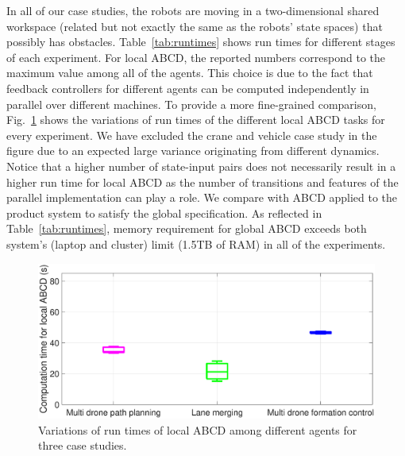 In all of our case studies, the robots are moving in a two-dimensional shared workspace (related but not exactly the same as the robots' state spaces) that possibly has obstacles. 
Table~\ref{tab:runtimes} shows run times for different stages of each experiment. 
For local ABCD, the reported numbers correspond to the maximum value among all of the agents. 
This choice is due to the fact that feedback controllers for different agents can be computed independently 
in parallel over different machines. 
To provide a more fine-grained comparison,
Fig.~\ref{fig:box_plot} shows the variations of run times of the different local ABCD tasks for every experiment. 
We have excluded the crane and vehicle case study in the figure due to an expected large variance originating from different dynamics. 
Notice that a higher number of state-input pairs does not necessarily result in a higher run time for local ABCD as the 
number of transitions and features of the parallel implementation can play a role. 
%
We compare \tool with ABCD applied to the product system to satisfy the global specification. 
As reflected in Table~\ref{tab:runtimes}, memory requirement for global ABCD exceeds both system's 
(laptop and cluster) limit (1.5TB of RAM) in all of the experiments.
%
%
\begin{figure}[t]
	\centering
	\includegraphics[width=\columnwidth]{figures/final_box_plot.eps}
	\caption{Variations of run times of local ABCD among different agents for three case studies.}
	\label{fig:box_plot}
	\vspace{-.3cm}
\end{figure}
%
